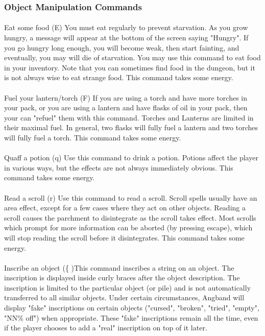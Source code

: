 \subsubsection{Object Manipulation Commands} 
\paragraph{}Eat some food
(E) You must eat regularly to prevent starvation. As you grow hungry, a
message will appear at the bottom of the screen saying "Hungry".  If you
go hungry long enough, you will become weak, then start fainting, and
eventually, you may will die of starvation. You may use this command to
eat food in your inventory. Note that you can sometimes find food in the
dungeon, but it is not always wise to eat strange food. This command
takes some energy.

\paragraph{}Fuel your lantern/torch (F) If you are using a torch and
have more torches in your pack, or you are using a lantern and have
flasks of oil in your pack, then your can "refuel" them with this
command. Torches and Lanterns are limited in their maximal fuel. In
general, two flasks will fully fuel a lantern and two torches will fully
fuel a torch. This command takes some energy.

\paragraph{}Quaff a potion (q) Use this command to drink a potion.
Potions affect the player in various ways, but the effects are not
always immediately obvious.  This command takes some energy.

\paragraph{}Read a scroll (r) Use this command to read a scroll. Scroll
spells usually have an area effect, except for a few cases where they
act on other objects.  Reading a scroll causes the parchment to
disintegrate as the scroll takes effect. Most scrolls which prompt for
more information can be aborted (by pressing escape), which will stop
reading the scroll before it disintegrates. This command takes some
energy.
 
\paragraph{}Inscribe an object (\{ )This command inscribes a string on an
object. The inscription is displayed inside curly braces after the
object description. The inscription is limited to the particular object
(or pile) and is not automatically transferred to all similar objects.
Under certain circumstances, Angband will display "fake" inscriptions on
certain objects ("cursed", "broken", "tried", "empty", "NN\% off") when
appropriate. These "fake" inscriptions remain all the time, even if the
player chooses to add a "real" inscription on top of it later.

